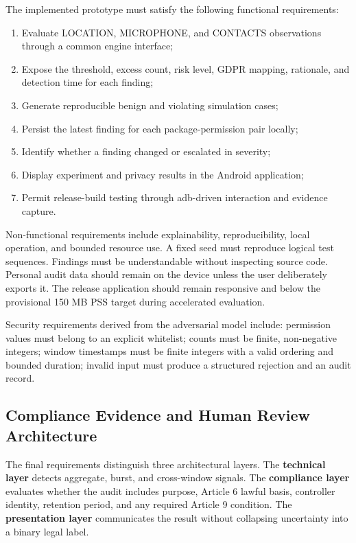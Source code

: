The implemented prototype must satisfy the following functional requirements:
\begin{enumerate}
\item Evaluate LOCATION, MICROPHONE, and CONTACTS observations through a common engine interface;
\item Expose the threshold, excess count, risk level, GDPR mapping, rationale, and detection time for each finding;
\item Generate reproducible benign and violating simulation cases;
\item Persist the latest finding for each package-permission pair locally;
\item Identify whether a finding changed or escalated in severity;
\item Display experiment and privacy results in the Android application;
\item Permit release-build testing through adb-driven interaction and evidence capture.
\end{enumerate}

Non-functional requirements include explainability, reproducibility, local operation, and bounded resource use. A fixed seed must reproduce logical test sequences. Findings must be understandable without inspecting source code. Personal audit data should remain on the device unless the user deliberately exports it. The release application should remain responsive and below the provisional 150 MB PSS target during accelerated evaluation.

Security requirements derived from the adversarial model include: permission values must belong to an explicit whitelist; counts must be finite, non-negative integers; window timestamps must be finite integers with a valid ordering and bounded duration; invalid input must produce a structured rejection and an audit record.

\subsection{Compliance Evidence and Human Review Architecture}

The final requirements distinguish three architectural layers. The \textbf{technical layer} detects aggregate, burst, and cross-window signals. The \textbf{compliance layer} evaluates whether the audit includes purpose, Article 6 lawful basis, controller identity, retention period, and any required Article 9 condition. The \textbf{presentation layer} communicates the result without collapsing uncertainty into a binary legal label.

